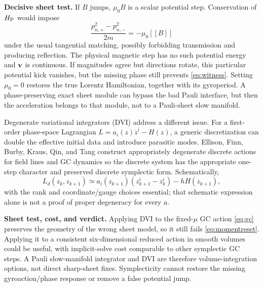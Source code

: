 \documentclass[10pt,a4paper]{article}
\newcommand{\jump}[1]{[\![#1]\!]}
\begin{document}
\textbf{Decisive sheet test.} If $B$ jumps, $\mu_0 B$ is a scalar potential step. Conservation of $H_{\rm P}$ would impose
\begin{equation}
 \frac{p_{n,+}^2-p_{n,-}^2}{2m}=-\mu_0\jump{B}
\end{equation}
under the usual tangential matching, possibly forbidding transmission and producing reflection. The physical magnetic step has no such potential energy and $\mathbf v$ is continuous. If magnitudes agree but directions rotate, this particular potential kick vanishes, but the missing phase still prevents \eqref{eq:witness}. Setting $\mu_0=0$ restores the true Lorentz Hamiltonian, together with its gyroperiod. A phase-preserving exact sheet module can bypass the bad Pauli interface, but then the acceleration belongs to that module, not to a Pauli-sheet slow manifold.

Degenerate variational integrators (DVI) address a different issue. For a first-order phase-space Lagrangian $L=a_i(z)\dot z^i-H(z)$, a generic discretization can double the effective initial data and introduce parasitic modes. Ellison, Finn, Burby, Kraus, Qin, and Tang \cite{dvi} construct appropriately degenerate discrete actions for field lines and GC dynamics so the discrete system has the appropriate one-step character and preserved discrete symplectic form. Schematically,
\begin{equation}
 L_d(z_k,z_{k+1})\simeq a_i(z_{k+1})(z_{k+1}^i-z_k^i)-hH(z_{k+1}),
\end{equation}
with the rank and coordinate/gauge choices essential; that schematic expression alone is not a proof of proper degeneracy for every $a$.

\textbf{Sheet test, cost, and verdict.} Applying DVI to the fixed-$\mu$ GC action \eqref{eq:gc} preserves the geometry of the wrong sheet model, so it still fails \eqref{eq:momentreset}. Applying it to a consistent six-dimensional reduced action in smooth volumes could be useful, with implicit-solve cost comparable to other symplectic GC steps. A Pauli slow-manifold integrator and DVI are therefore volume-integration options, not direct sharp-sheet fixes. Symplecticity cannot restore the missing gyroaction/phase response or remove a false potential jump.
\end{document}
